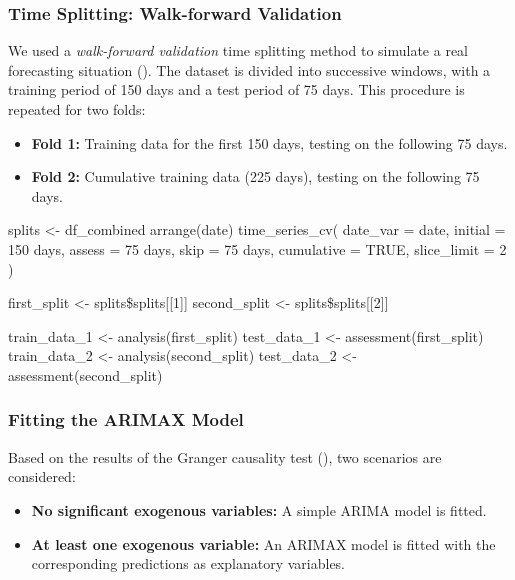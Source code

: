\documentclass[12pt]{report}
\begin{document}
\subsubsection{Time Splitting: Walk-forward Validation}

We used a \textit{walk-forward validation} time splitting method to simulate a real forecasting situation (\cite{hyndman2018forecasting}). The dataset is divided into successive windows, with a training period of 150 days and a test period of 75 days. This procedure is repeated for two folds:

\begin{itemize}
    \item \textbf{Fold 1:} Training data for the first 150 days, testing on the following 75 days.
    \item \textbf{Fold 2:} Cumulative training data (225 days), testing on the following 75 days.
\end{itemize}

\begin{code}
splits <- df_combined %
  arrange(date) %
  time_series_cv(
    date_var   = date,
    initial    = 150 days,
    assess     = 75 days,
    skip       = 75 days,
    cumulative = TRUE,
    slice_limit = 2
  )
\end{code}

\begin{code}
first_split <- splits\$splits[[1]]
second_split <- splits\$splits[[2]]

train_data_1 <- analysis(first_split)
test_data_1  <- assessment(first_split)
train_data_2 <- analysis(second_split)
test_data_2  <- assessment(second_split)
\end{code}

\subsubsection{Fitting the ARIMAX Model}

Based on the results of the Granger causality test (\cite{granger1969investigating}), two scenarios are considered:
\begin{itemize}
    \item \textbf{No significant exogenous variables:} A simple ARIMA model is fitted.
    \item \textbf{At least one exogenous variable:} An ARIMAX model is fitted with the corresponding predictions as explanatory variables.
\end{itemize}
\end{document}
